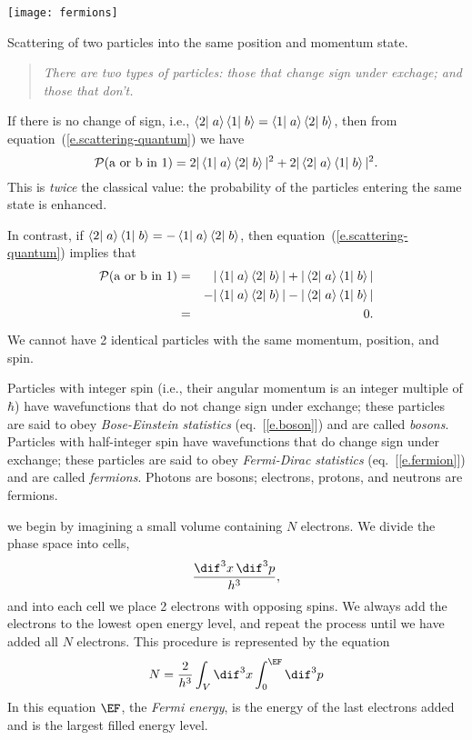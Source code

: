 \begin{marginfigure}[-8\baselineskip]
    \texttt{[image: fermions]}
    \caption[Scattering of fermions]{\label{f.fermions}Scattering of two particles into the same position and momentum state.}
\end{marginfigure}

\begin{quote}\itshape
    There are two types of particles: those that change sign under exchage; and those that don't.
\end{quote}

If there is no change of sign, i.e., $\left\langle2\right|\left.a\right\rangle\left\langle1\right|\left.b\right\rangle = \left\langle1\right|\left.a\right\rangle\left\langle2\right|\left.b\right\rangle$, then from equation~(\ref{e.scattering-quantum}) we have
\begin{equation}\label{e.boson}
    \mathcal{P}(\textrm{a or b in 1}) = 2|\left\langle1\right|\left.a\right\rangle\left\langle2\right|\left.b\right\rangle|^2 + 2|\left\langle2\right|\left.a\right\rangle\left\langle1\right|\left.b\right\rangle|^2.
\end{equation}
This is \emph{twice} the classical value: the probability of the particles entering the same state is enhanced.

In contrast, if $\left\langle2\right|\left.a\right\rangle\left\langle1\right|\left.b\right\rangle = -\left\langle1\right|\left.a\right\rangle\left\langle2\right|\left.b\right\rangle$, then equation~(\ref{e.scattering-quantum}) implies that
\begin{eqnarray}
\mathcal{P}(\textrm{a or b in 1}) &=& |\left\langle1\right|\left.a\right\rangle\left\langle2\right|\left.b\right\rangle| + |\left\langle2\right|\left.a\right\rangle\left\langle1\right|\left.b\right\rangle| \nonumber\\ 
    && - |\left\langle1\right|\left.a\right\rangle\left\langle2\right|\left.b\right\rangle| - |\left\langle2\right|\left.a\right\rangle\left\langle1\right|\left.b\right\rangle| \nonumber\\ 
    &=& 0.\label{e.fermion}
\end{eqnarray}
We cannot have 2 identical particles with the same momentum, position, and spin. 

Particles with integer spin (i.e., their angular momentum is an integer multiple of $\hbar$) have wavefunctions that do not change sign under exchange; these particles are said to obey \emph{Bose-Einstein statistics} (eq.~[\ref{e.boson}]) and are called \emph{bosons}.  Particles with half-integer spin have wavefunctions that do change sign under exchange; these particles are said to obey \emph{Fermi-Dirac statistics} (eq.~[\ref{e.fermion}]) and are called \emph{fermions}.  Photons are bosons; electrons, protons, and neutrons are fermions.

 we begin by imagining a small volume containing $N$ electrons. We divide the phase space into cells,
\[
	\frac{\dif^{3}x\,\dif^{3}p}{h^{3}},
\]
and into each cell we place 2 electrons with opposing spins. We always add the electrons to the lowest open energy level, and repeat the process until we have added all $N$ electrons. This procedure is represented by the equation
\begin{equation}
	N = \frac{2}{h^{3}}\int_{V}\dif^{3}x\int_{0}^{\EF}\dif^{3}p
\end{equation}
In this equation $\EF$, the \emph{Fermi energy}, is the energy of the last electrons added and is the largest filled energy level.

